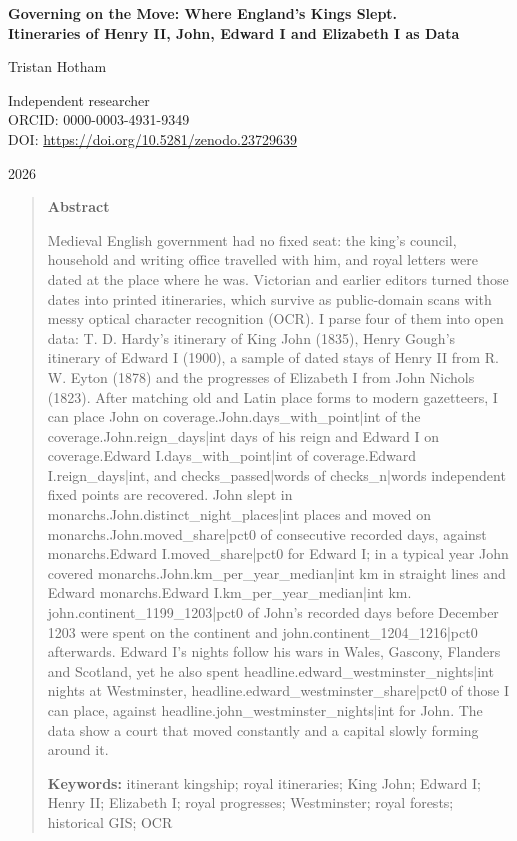 \documentclass[11pt,a4paper]{article}
\begin{document}
\begin{center}
{\Large\bfseries Governing on the Move: Where England's Kings Slept.\\[2pt] Itineraries of Henry II, John, Edward I and Elizabeth I as Data\par}
\vspace{1.2em}
{\large Tristan Hotham\par}
\vspace{0.3em}
{\small Independent researcher\\
ORCID: 0000-0003-4931-9349\\
DOI: \href{https://doi.org/10.5281/zenodo.23729639}{https://doi.org/10.5281/zenodo.23729639}\par}
\vspace{0.8em}
2026
\end{center}

\begin{quote}
\small
\begin{center}\textbf{Abstract}\end{center}
Medieval English government had no fixed seat: the king's council, household and writing office travelled with him, and royal letters were dated at the place where he was. Victorian and earlier editors turned those dates into printed itineraries, which survive as public-domain scans with messy optical character recognition (OCR). I parse four of them into open data: T. D. Hardy's itinerary of King John (1835), Henry Gough's itinerary of Edward I (1900), a sample of dated stays of Henry II from R. W. Eyton (1878) and the progresses of Elizabeth I from John Nichols (1823). After matching old and Latin place forms to modern gazetteers, I can place John on {{coverage.John.days_with_point|int}} of the {{coverage.John.reign_days|int}} days of his reign and Edward I on {{coverage.Edward I.days_with_point|int}} of {{coverage.Edward I.reign_days|int}}, and {{checks_passed|words}} of {{checks_n|words}} independent fixed points are recovered. John slept in {{monarchs.John.distinct_night_places|int}} places and moved on {{monarchs.John.moved_share|pct0}} of consecutive recorded days, against {{monarchs.Edward I.moved_share|pct0}} for Edward I; in a typical year John covered {{monarchs.John.km_per_year_median|int}} km in straight lines and Edward {{monarchs.Edward I.km_per_year_median|int}} km. {{john.continent_1199_1203|pct0}} of John's recorded days before December 1203 were spent on the continent and {{john.continent_1204_1216|pct0}} afterwards. Edward I's nights follow his wars in Wales, Gascony, Flanders and Scotland, yet he also spent {{headline.edward_westminster_nights|int}} nights at Westminster, {{headline.edward_westminster_share|pct0}} of those I can place, against {{headline.john_westminster_nights|int}} for John. The data show a court that moved constantly and a capital slowly forming around it.

\textbf{Keywords:} itinerant kingship; royal itineraries; King John; Edward I; Henry II; Elizabeth I; royal progresses; Westminster; royal forests; historical GIS; OCR
\end{quote}
\end{document}
